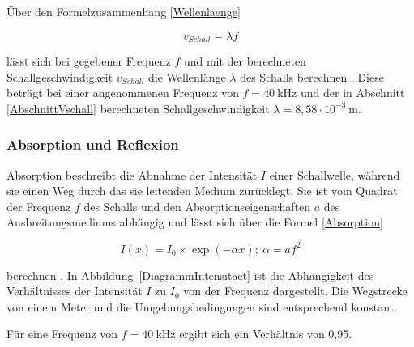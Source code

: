 Über den Formelzusammenhang \ref{Wellenlaenge}

\begin{equation}
    v_{Schall}=\lambda f
    \label{Wellenlaenge}
\end{equation}

lässt sich bei gegebener Frequenz $f$ und mit der berechneten Schallgeschwindigkeit $v_{Schall}$ die Wellenlänge $\lambda$ des Schalls berechnen \cite{Willems:2022}. Diese beträgt bei einer angenommenen Frequenz von $f=40 \:\text{kHz}$ und der in Abschnitt \ref{AbschnittVschall} berechneten Schallgeschwindigkeit $\lambda=8{,}58\cdot10^{-3} \:\text{m}$.

\subsubsection{Absorption und Reflexion}

Absorption beschreibt die Abnahme der Intensität $I$ einer Schallwelle, während sie einen Weg durch das sie leitenden Medium zurücklegt. Sie ist vom Quadrat der Frequenz $f$ des Schalls und den Absorptionseigenschaften $a$ des Ausbreitungsmediums abhängig und lässt sich über die Formel \ref{Absorption}

\begin{equation}
    I(x)=I_0\times\exp(-\alpha x); \:\alpha=af^2
    \label{Absorption}
\end{equation}

berechnen \cite{Hering:2023,Hering:2021b}.
In Abbildung~\ref{DiagrammIntensitaet} ist die Abhängigkeit des Verhältnisses der Intensität $I$ zu $I_0$ von der Frequenz dargestellt. Die Wegstrecke von einem Meter und die Umgebungsbedingungen sind entsprechend konstant.

Für eine Frequenz von $f=40 \:\text{kHz}$ ergibt sich ein Verhältnis von 0,95.

